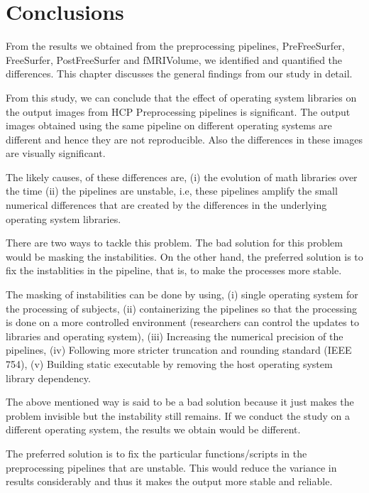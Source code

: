 \chapter{Conclusions}\label{conclusion}
From the results we obtained from the preprocessing pipelines, PreFreeSurfer, FreeSurfer, PostFreeSurfer and fMRIVolume, we identified and quantified the differences. This chapter discusses the general findings from our study in detail.

From this study, we can conclude that the effect of operating system libraries on the output images from HCP Preprocessing pipelines is significant. The output images obtained using the same pipeline on different operating systems are different and hence they are not reproducible. Also the differences in these images are visually significant.

The likely causes, of these differences are, (i) the evolution of math libraries over the time (ii) the pipelines are unstable, i.e, these pipelines amplify the small numerical differences that are created by the differences in the underlying operating system libraries.

There are two ways to tackle this problem. The bad solution for this problem would be masking the instabilities. On the other hand, the preferred solution is to fix the instablities in the pipeline, that is, to make the processes more stable.

The masking of instabilities can be done by using, (i) single operating system for the processing of subjects, (ii) containerizing the pipelines so that the processing is done on a more controlled environment (researchers can control the updates to libraries and operating system), (iii) Increasing the numerical precision of the pipelines, (iv) Following more stricter truncation and rounding standard (IEEE 754), (v) Building static executable by removing the host operating system library dependency.

The above mentioned way is said to be a bad solution because it just makes the problem invisible but the instability still remains. If we conduct the study on a different operating system, the results we obtain would be different.

The preferred solution is to fix the particular functions/scripts in the preprocessing pipelines that are unstable. This would reduce the variance in results considerably and thus it makes the output more stable and reliable.



